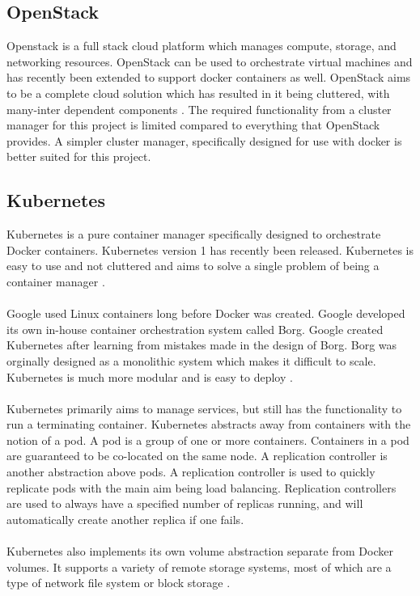 \documentclass{sig-alternate-05-2015}
\begin{document}
\subsection{OpenStack}
Openstack is a full stack cloud platform which manages compute, storage, and networking resources. OpenStack can be used to orchestrate virtual machines and has recently been extended to support docker containers as well. OpenStack aims to be a complete cloud solution which has resulted in it being cluttered, with many-inter dependent components \cite{affetti2015adock}. The required functionality  from a cluster manager for this project is limited compared to everything that OpenStack provides. A simpler cluster manager, specifically designed for use with docker is better suited for this project.


\subsection{Kubernetes}
Kubernetes is a pure container manager specifically designed to orchestrate Docker containers. Kubernetes version 1 has recently been released. Kubernetes is easy to use and not cluttered and aims to solve a single problem of being a container manager \cite{googleborg}. 
\\\\
Google used Linux containers long before Docker was created. Google developed its own in-house container orchestration system called Borg. Google created Kubernetes after learning from mistakes made in the design of Borg. Borg was orginally designed as a monolithic system which makes it difficult to scale. Kubernetes is much more modular and is easy to deploy \cite{googleborg}.
\\\\
Kubernetes primarily aims to manage services, but still has the functionality to run a terminating container. Kubernetes abstracts away from containers with the notion of a pod. A pod is a group of one or more containers. Containers in a pod are guaranteed to be co-located on the same node. A replication controller is another abstraction above pods. A replication controller is used to quickly replicate pods with the main aim being load balancing. Replication controllers are used to always have a specified number of replicas running, and will automatically create another replica if one fails.
\\\\
Kubernetes also implements its own volume abstraction separate from Docker volumes. It supports a variety of remote storage systems, most of which are a type of network file system or block storage \cite{kubernetesreadme}.
\end{document}
